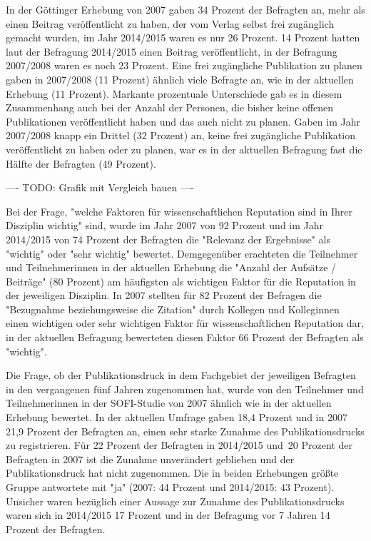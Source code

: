 In der Göttinger Erhebung von 2007 gaben 34 Prozent der Befragten an, mehr als einen Beitrag veröffentlicht zu haben, der vom Verlag selbst frei zugänglich gemacht wurden, im Jahr 2014/2015 waren es nur 26 Prozent. 14 Prozent hatten laut der Befragung 2014/2015 einen Beitrag veröffentlicht, in der Befragung 2007/2008 waren es noch 23 Prozent. Eine frei zugängliche Publikation zu planen gaben in 2007/2008 (11 Prozent) ähnlich viele Befragte an, wie in der aktuellen Erhebung (11 Prozent). Markante prozentuale Unterschiede gab es in diesem Zusammenhang auch bei der Anzahl der Personen, die bisher keine offenen Publikationen veröffentlicht haben und das auch nicht zu planen. Gaben im Jahr 2007/2008 knapp ein Drittel (32 Prozent) an, keine frei zugängliche Publikation veröffentlicht zu haben oder zu planen, war es in der aktuellen Befragung fast die Hälfte der Befragten (49 Prozent).

---- TODO: Grafik mit Vergleich bauen ----

Bei der Frage, "welche Faktoren für wissenschaftlichen Reputation sind in Ihrer Disziplin wichtig" sind, wurde im Jahr 2007 von 92 Prozent und im Jahr 2014/2015 von 74 Prozent der Befragten die "Relevanz der Ergebnisse" als "wichtig" oder "sehr wichtig" bewertet. Demgegenüber erachteten die Teilnehmer und Teilnehmerinnen in der aktuellen Erhebung die "Anzahl der Aufsätze / Beiträge" (80 Prozent) am häufigsten als wichtigen Faktor für die Reputation in der jeweiligen Disziplin. In 2007 stellten für 82 Prozent der Befragen die "Bezugnahme beziehungsweise die Zitation" durch Kollegen und Kolleginnen einen wichtigen oder sehr wichtigen Faktor für wissenschaftlichen Reputation dar, in der aktuellen Befragung bewerteten diesen Faktor 66 Prozent der Befragten als "wichtig".

Die Frage, ob der Publikationsdruck in dem Fachgebiet der jeweiligen Befragten in den vergangenen fünf Jahren zugenommen hat, wurde von den Teilnehmer und Teilnehmerinnen in der SOFI-Studie von 2007 ähnlich wie in der aktuellen Erhebung bewertet. In der aktuellen Umfrage gaben 18,4 Prozent und in 2007 21,9 Prozent der Befragten an, einen sehr starke Zunahme des Publikationsdrucks zu registrieren. Für 22 Prozent der Befragten in 2014/2015 und 20 Prozent der Befragten in 2007 ist die Zunahme unverändert geblieben und der Publikationsdruck hat nicht zugenommen. Die in beiden Erhebungen größte Gruppe antwortete mit "ja" (2007: 44 Prozent und 2014/2015: 43 Prozent). Unsicher waren bezüglich einer Aussage zur Zunahme des Publikationsdrucks waren sich in 2014/2015 17 Prozent und in der Befragung vor 7 Jahren 14 Prozent der Befragten.

